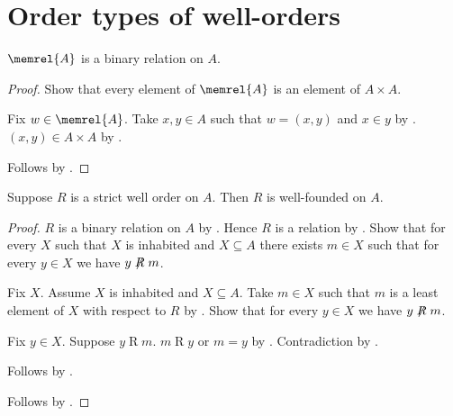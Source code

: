 









\section{Order types of well-orders}

\begin{proposition}\label{membership_relation_binary_on}
    $\memrel{A}$ is a binary relation on $A$.
\end{proposition}
\begin{proof}
    Show that every element of $\memrel{A}$ is an element of $A\times A$.
    \begin{subproof}
        Fix $w\in\memrel{A}$.
        Take $x,y\in A$ such that $w=(x,y)$ and $x\in y$
            by .
        $(x,y)\in A\times A$ by .
    \end{subproof}
    Follows by .
\end{proof}

\begin{proposition}\label{strict_well_order_is_well_founded}
    Suppose $R$ is a strict well order on $A$.
    Then $R$ is well-founded on $A$.
\end{proposition}
\begin{proof}
    $R$ is a binary relation on $A$ by
        .
    Hence $R$ is a relation by
        .
    Show that for every $X$ such that $X$ is inhabited and $X\subseteq A$
        there exists $m\in X$ such that for every $y\in X$
        we have $y\not\mathrel{R}m$.
    \begin{subproof}
        Fix $X$.
        Assume $X$ is inhabited and $X\subseteq A$.
        Take $m\in X$ such that $m$ is a least element of $X$
            with respect to $R$ by .
        Show that for every $y\in X$ we have $y\not\mathrel{R}m$.
        \begin{subproof}
            Fix $y\in X$.
            Suppose $y\mathrel{R}m$.
            $m\mathrel{R}y$ or $m=y$ by .
            Contradiction by
                .
        \end{subproof}
        Follows by \auto.
    \end{subproof}
    Follows by .
\end{proof}

